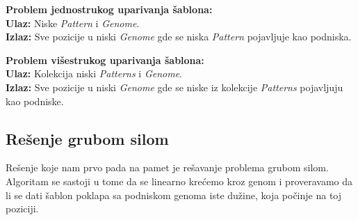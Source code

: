 \begin{tcolorbox}
\textbf{Problem jednostrukog uparivanja šablona:} \\
\indent \textbf{Ulaz:} Niske \textit{Pattern} i \textit{Genome}. \\
\indent \textbf{Izlaz:} Sve pozicije u niski \textit{Genome} gde se niska \textit{Pattern} pojavljuje kao podniska.
\end{tcolorbox}

\begin{tcolorbox}
\textbf{Problem višestrukog uparivanja šablona:} \\
\indent \textbf{Ulaz:} Kolekcija niski \textit{Patterns} i \textit{Genome}. \\
\indent \textbf{Izlaz:} Sve pozicije u niski \textit{Genome} gde se niske iz kolekcije \textit{Patterns} pojavljuju kao podniske.
\end{tcolorbox}


\subsection{Rešenje grubom silom}

Rešenje koje nam prvo pada na pamet je rešavanje problema grubom silom. Algoritam se sastoji u tome da se linearno krećemo kroz genom i proveravamo da li se dati šablon poklapa sa podniskom genoma iste dužine, koja počinje na toj poziciji.


